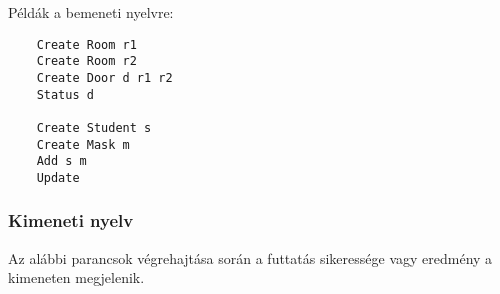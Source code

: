 Példák a bemeneti nyelvre:
\begin{verbatim}
    Create Room r1
    Create Room r2
    Create Door d r1 r2
    Status d

    Create Student s
    Create Mask m
    Add s m
    Update
\end{verbatim}


\subsubsection{Kimeneti nyelv}

Az alábbi parancsok végrehajtása során a futtatás sikeressége vagy eredmény a kimeneten megjelenik.

